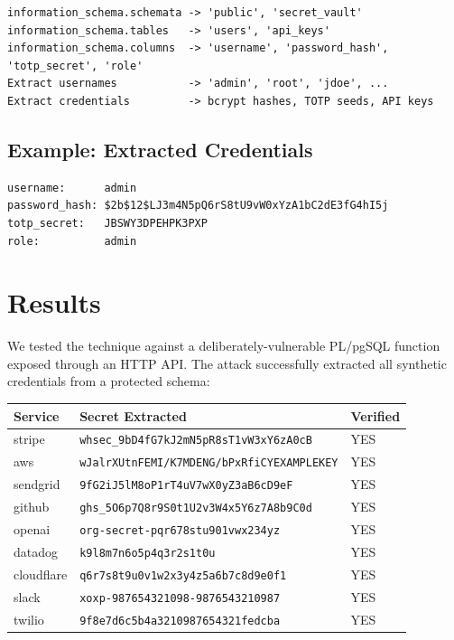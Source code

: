 \documentclass[11pt]{article}
\begin{document}
\begin{lstlisting}
information_schema.schemata -> 'public', 'secret_vault'
information_schema.tables   -> 'users', 'api_keys'
information_schema.columns  -> 'username', 'password_hash', 'totp_secret', 'role'
Extract usernames           -> 'admin', 'root', 'jdoe', ...
Extract credentials         -> bcrypt hashes, TOTP seeds, API keys
\end{lstlisting}

\subsection{Example: Extracted Credentials}

\begin{lstlisting}
username:      admin
password_hash: $2b$12$LJ3m4N5pQ6rS8tU9vW0xYzA1bC2dE3fG4hI5j
totp_secret:   JBSWY3DPEHPK3PXP
role:          admin
\end{lstlisting}

\section{Results}

We tested the technique against a deliberately-vulnerable PL/pgSQL function
exposed through an HTTP API. The attack successfully extracted all synthetic
credentials from a protected schema:

\begin{table}[h]
\centering
\small
\begin{tabular}{@{}lll@{}}
\toprule
Service & Secret Extracted & Verified \\
\midrule
stripe     & \lstinline|whsec_9bD4fG7kJ2mN5pR8sT1vW3xY6zA0cB|    & YES \\
aws        & \lstinline|wJalrXUtnFEMI/K7MDENG/bPxRfiCYEXAMPLEKEY| & YES \\
sendgrid   & \lstinline|9fG2iJ5lM8oP1rT4uV7wX0yZ3aB6cD9eF|       & YES \\
github     & \lstinline|ghs_5O6p7Q8r9S0t1U2v3W4x5Y6z7A8b9C0d|    & YES \\
openai     & \lstinline|org-secret-pqr678stu901vwx234yz|         & YES \\
datadog    & \lstinline|k9l8m7n6o5p4q3r2s1t0u|                   & YES \\
cloudflare & \lstinline|q6r7s8t9u0v1w2x3y4z5a6b7c8d9e0f1|        & YES \\
slack      & \lstinline|xoxp-987654321098-9876543210987|         & YES \\
twilio     & \lstinline|9f8e7d6c5b4a3210987654321fedcba|         & YES \\
\bottomrule
\end{tabular}
\end{table}
\end{document}
